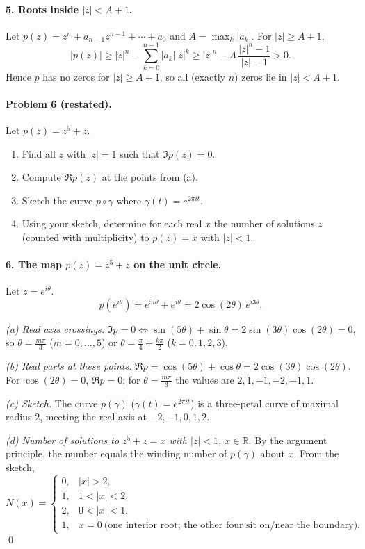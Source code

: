 \documentclass[11pt,a4paper]{article}
\theoremstyle{definition}
\theoremstyle{definition}
\theoremstyle{plain}
\theoremstyle{remark}
\begin{document}
\paragraph{5. Roots inside $|z|<A+1$.}
Let $p(z)=z^{n}+a_{n-1}z^{n-1}+\cdots+a_0$ and $A=\max_{k}|a_k|$. For $|z|\ge A+1$,
\[
|p(z)|\ge |z|^{n}-\sum_{k=0}^{n-1}|a_k||z|^{k}
\ge |z|^{n}-A\,\frac{|z|^{n}-1}{|z|-1}>0.
\]
Hence $p$ has no zeros for $|z|\ge A+1$, so all (exactly $n$) zeros lie in $|z|<A+1$.

\medskip

\paragraph{Problem 6 (restated).}
Let $p(z)=z^{5}+z$.
\begin{enumerate}[label=(\alph*)]
	\item Find all $z$ with $|z|=1$ such that $\Im p(z)=0$.
	\item Compute $\Re p(z)$ at the points from (a).
	\item Sketch the curve $p\circ\gamma$ where $\gamma(t)=e^{2\pi i t}$.
	\item Using your sketch, determine for each real $x$ the number of solutions $z$ (counted with multiplicity) to $p(z)=x$ with $|z|<1$.
\end{enumerate}

\paragraph{6. The map $p(z)=z^{5}+z$ on the unit circle.}
Let $z=e^{i\theta}$.
\[
p(e^{i\theta})=e^{5i\theta}+e^{i\theta}
=2\cos(2\theta)\,e^{i3\theta}.
\]

\emph{(a) Real axis crossings.} $\Im p=0 \iff \sin(5\theta)+\sin\theta=2\sin(3\theta)\cos(2\theta)=0$,
so $\theta=\frac{m\pi}{3}$ ($m=0,\dots,5$) or $\theta=\frac{\pi}{4}+\frac{k\pi}{2}$ ($k=0,1,2,3$).

\emph{(b) Real parts at these points.} $\Re p=\cos(5\theta)+\cos\theta=2\cos(3\theta)\cos(2\theta)$.
For $\cos(2\theta)=0$, $\Re p=0$; for $\theta=\frac{m\pi}{3}$ the values are $2,1,-1,-2,-1,1$.

\emph{(c) Sketch.} The curve $p(\gamma)$ ($\gamma(t)=e^{2\pi it}$) is a three-petal curve of maximal radius $2$, meeting the real axis at $-2,-1,0,1,2$.

\emph{(d) Number of solutions to $z^{5}+z=x$ with $|z|<1$, $x\in\mathbb R$.}
By the argument principle, the number equals the winding number of $p(\gamma)$ about $x$. From the sketch,
\[
N(x)=
\begin{cases}
	0, & |x|>2,\\[2pt]
	1, & 1<|x|<2,\\[2pt]
	2, & 0<|x|<1,\\[2pt]
	1, & x=0\ \text{(one interior root; the other four sit on/near the boundary)}.
\end{cases}
\]
\qed
\end{document}
